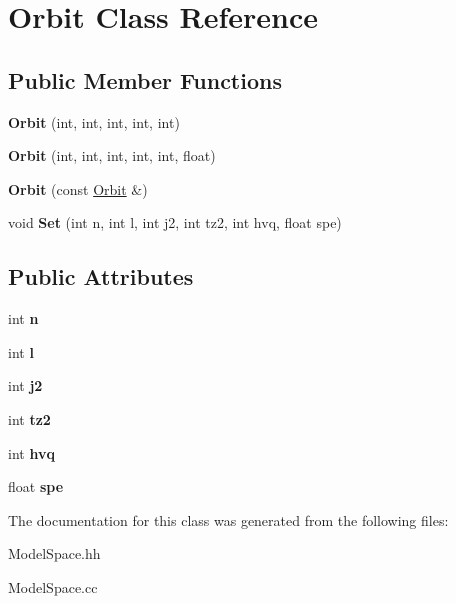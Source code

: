 \hypertarget{classOrbit}{\section{Orbit Class Reference}
\label{classOrbit}
}
\subsection*{Public Member Functions}
\begin{DoxyCompactItemize}
\item 
\hypertarget{classOrbit_a83f3efcee505c28e0679eeb3c9789ab7}{{\bfseries Orbit} (int, int, int, int, int)}\label{classOrbit_a83f3efcee505c28e0679eeb3c9789ab7}

\item 
\hypertarget{classOrbit_a70c608de3757cdb72a060f4ff05ac757}{{\bfseries Orbit} (int, int, int, int, int, float)}\label{classOrbit_a70c608de3757cdb72a060f4ff05ac757}

\item 
\hypertarget{classOrbit_acc12b8fdfccd5dc2aacbf06baa7a9d03}{{\bfseries Orbit} (const \hyperlink{classOrbit}{Orbit} \&)}\label{classOrbit_acc12b8fdfccd5dc2aacbf06baa7a9d03}

\item 
\hypertarget{classOrbit_a524812049fba1eed56d5ab675b5ef3b1}{void {\bfseries Set} (int n, int l, int j2, int tz2, int hvq, float spe)}\label{classOrbit_a524812049fba1eed56d5ab675b5ef3b1}

\end{DoxyCompactItemize}
\subsection*{Public Attributes}
\begin{DoxyCompactItemize}
\item 
\hypertarget{classOrbit_a61c756b2fd626b9222fea5a2b4622eca}{int {\bfseries n}}\label{classOrbit_a61c756b2fd626b9222fea5a2b4622eca}

\item 
\hypertarget{classOrbit_a3b03c063df7856524db81274331d0e4b}{int {\bfseries l}}\label{classOrbit_a3b03c063df7856524db81274331d0e4b}

\item 
\hypertarget{classOrbit_a039f1fb20d41a2227bb61c2078e67d8b}{int {\bfseries j2}}\label{classOrbit_a039f1fb20d41a2227bb61c2078e67d8b}

\item 
\hypertarget{classOrbit_a9f9a4be881aa8b960b43fb3171617816}{int {\bfseries tz2}}\label{classOrbit_a9f9a4be881aa8b960b43fb3171617816}

\item 
\hypertarget{classOrbit_a5bc0a374c0387886e2e67d181b530951}{int {\bfseries hvq}}\label{classOrbit_a5bc0a374c0387886e2e67d181b530951}

\item 
\hypertarget{classOrbit_a6cb03e807ebbec9c172be4a1f222c8fd}{float {\bfseries spe}}\label{classOrbit_a6cb03e807ebbec9c172be4a1f222c8fd}

\end{DoxyCompactItemize}


The documentation for this class was generated from the following files\-:\begin{DoxyCompactItemize}
\item 
Model\-Space.\-hh\item 
Model\-Space.\-cc\end{DoxyCompactItemize}
